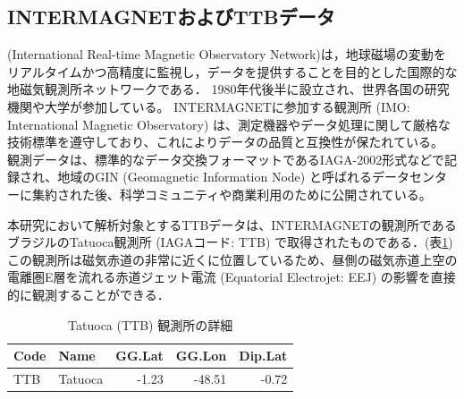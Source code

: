 \subsection{INTERMAGNETおよびTTBデータ}

\cite{INTERMAGNET} (International Real-time Magnetic Observatory Network)は，地球磁場の変動をリアルタイムかつ高精度に監視し，データを提供することを目的とした国際的な地磁気観測所ネットワークである．
1980年代後半に設立され、世界各国の研究機関や大学が参加している。
INTERMAGNETに参加する観測所 (IMO: International Magnetic Observatory) は、測定機器やデータ処理に関して厳格な技術標準を遵守しており、これによりデータの品質と互換性が保たれている。
観測データは、標準的なデータ交換フォーマットであるIAGA-2002形式などで記録され、地域のGIN (Geomagnetic Information Node) と呼ばれるデータセンターに集約された後、科学コミュニティや商業利用のために公開されている。

本研究において解析対象とするTTBデータは、INTERMAGNETの観測所であるブラジルのTatuoca観測所 (IAGAコード: TTB) で取得されたものである．(表\ref{tab:ttb_station})
この観測所は磁気赤道の非常に近くに位置しているため、昼側の磁気赤道上空の電離圏E層を流れる赤道ジェット電流 (Equatorial Electrojet: EEJ) の影響を直接的に観測することができる．

\begin{table}[htbp]
  \centering
  \caption{Tatuoca (TTB) 観測所の詳細}
  \label{tab:ttb_station}
  \begin{tabular}{llrrr}
    \toprule
    Code & Name & GG.Lat & GG.Lon  & Dip.Lat \\
    \midrule
    TTB & Tatuoca & -1.23 & -48.51 & -0.72 \\
    \bottomrule
  \end{tabular}
\end{table}
